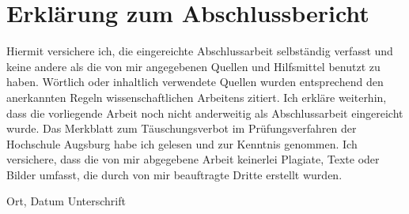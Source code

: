 \documentclass[oneside]{wissdoc}
\begin{document}
\clearpage


\graphicspath{{figures/}}


  
     







\appendix





\printglossary[type=\acronymtype,title={Abkürzungen}]
\printglossary[type=main]

\clearpage

\listoffigures
{}
\clearpage

\listoftables
{}
\clearpage



\ifnotonesideelse{\cleardoublepage}{}

%
%
\printbibliography 





\printindex            %

\clearpage
\chapter*{Erklärung zum Abschlussbericht}
Hiermit versichere ich, die eingereichte Abschlussarbeit selbständig verfasst und keine andere als die von mir angegebenen Quellen und Hilfsmittel benutzt zu haben. Wörtlich oder inhaltlich verwendete Quellen wurden entsprechend den anerkannten Regeln wissenschaftlichen Arbeitens zitiert. Ich erkläre weiterhin, dass die vorliegende Arbeit noch nicht anderweitig als Abschlussarbeit eingereicht wurde. Das Merkblatt zum Täuschungsverbot im Prüfungsverfahren der Hochschule Augsburg habe ich gelesen und zur Kenntnis genommen. Ich versichere, dass die von mir abgegebene Arbeit keinerlei Plagiate, Texte oder Bilder umfasst, die durch von mir beauftragte Dritte erstellt wurden.

\vspace{4cm}

\hspace{2cm} Ort, Datum \hfill Unterschrift \hspace{2cm}
\end{document}
